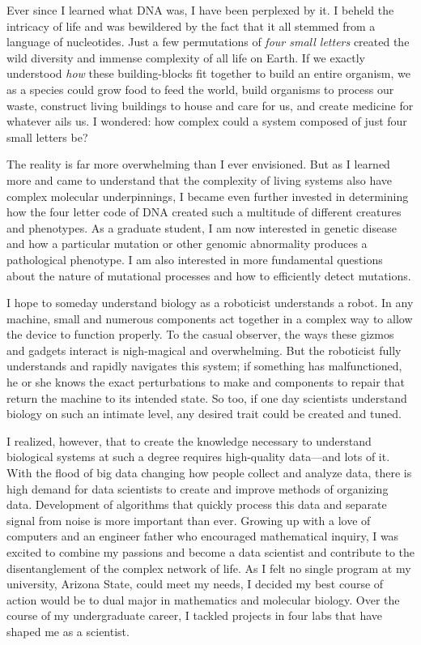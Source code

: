 \documentclass[12pt]{article}
\begin{document}

Ever since I learned what DNA was, I have been perplexed by it. I beheld the intricacy of life and was bewildered by the fact that it all stemmed from a language of nucleotides. Just a few permutations of \textit{four small letters} created the wild diversity and immense complexity of all life on Earth. If we exactly understood \textit{how} these building-blocks fit together to build an entire organism, we as a species could grow food to feed the world, build organisms to process our waste, construct living buildings to house and care for us, and create medicine for whatever ails us. I wondered: how complex could a system composed of just four small letters be?

The reality is far more overwhelming than I ever envisioned.
But as I learned more and came to understand that the complexity of living systems also have complex molecular underpinnings, I became even further invested in determining how the four letter code of DNA created such a multitude of different creatures and phenotypes.
As a graduate student, I am now interested in genetic disease and how a particular mutation or other genomic abnormality produces a pathological phenotype. I am also interested in more fundamental questions about the nature of mutational processes and how to efficiently detect mutations.

I hope to someday understand biology as a roboticist understands a robot. In any machine, small and numerous components act together in a complex way to allow the device to function properly. To the casual observer, the ways these gizmos and gadgets interact is nigh-magical and overwhelming. But the roboticist fully understands and rapidly navigates this system; if something has malfunctioned, he or she knows the exact perturbations to make and components to repair that return the machine to its intended state. So too, if one day scientists understand biology on such an intimate level, any desired trait could be created and tuned.

I realized, however, that to create the knowledge necessary to understand biological systems at such a degree requires high-quality data---and lots of it. With the flood of big data changing how people collect and analyze data, there is high demand for data scientists to create and improve methods of organizing data. Development of algorithms that quickly process this data and separate signal from noise is more important than ever. Growing up with a love of computers and an engineer father who encouraged mathematical inquiry, I was excited to combine my passions and become a data scientist and contribute to the disentanglement of the complex network of life. As I felt no single program at my university, Arizona State, could meet my needs, I decided my best course of action would be to dual major in mathematics and molecular biology. Over the course of my undergraduate career, I tackled projects in four labs that have shaped me as a scientist.
\end{document}
